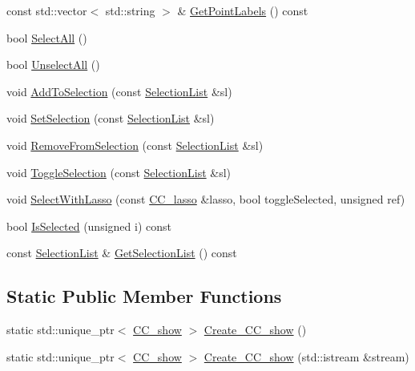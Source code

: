 \begin{DoxyCompactItemize}
\item 
const std\-::vector$<$ std\-::string $>$ \& \hyperlink{a00046_a0574f19c81b418d1eb797eaae248affd}{Get\-Point\-Labels} () const 
\item 
bool \hyperlink{a00046_aaee97d70a81c9596385f8882a626d2de}{Select\-All} ()
\item 
bool \hyperlink{a00046_aa8fe7ec10f04ef7bf151b6e64eee6e4c}{Unselect\-All} ()
\item 
void \hyperlink{a00046_a11a015a0e3eaa2532d60ae2c120fd97a}{Add\-To\-Selection} (const \hyperlink{a00214_aaec86d4bb87e1e6f0b60e6e551c5e570}{Selection\-List} \&sl)
\item 
void \hyperlink{a00046_a7c3f383669e4ac25019fbffa779238f1}{Set\-Selection} (const \hyperlink{a00214_aaec86d4bb87e1e6f0b60e6e551c5e570}{Selection\-List} \&sl)
\item 
void \hyperlink{a00046_a6c80041882f1acce3e9cef1919c65f77}{Remove\-From\-Selection} (const \hyperlink{a00214_aaec86d4bb87e1e6f0b60e6e551c5e570}{Selection\-List} \&sl)
\item 
void \hyperlink{a00046_af3690e0e71df95ed35eaab5f28525167}{Toggle\-Selection} (const \hyperlink{a00214_aaec86d4bb87e1e6f0b60e6e551c5e570}{Selection\-List} \&sl)
\item 
void \hyperlink{a00046_a0af4ec5740bda38adcca1846ee23a280}{Select\-With\-Lasso} (const \hyperlink{a00033}{C\-C\-\_\-lasso} \&lasso, bool toggle\-Selected, unsigned ref)
\item 
bool \hyperlink{a00046_af45d6cad44e602a85f6fa19b0b7cf85a}{Is\-Selected} (unsigned i) const 
\item 
const \hyperlink{a00214_aaec86d4bb87e1e6f0b60e6e551c5e570}{Selection\-List} \& \hyperlink{a00046_a2c20d9756270755eaa0710574d0f791c}{Get\-Selection\-List} () const 
\end{DoxyCompactItemize}
\subsection*{Static Public Member Functions}
\begin{DoxyCompactItemize}
\item 
static std\-::unique\-\_\-ptr$<$ \hyperlink{a00046}{C\-C\-\_\-show} $>$ \hyperlink{a00046_a86ec240f2bc5ed1988d05ae41c8a4ad7}{Create\-\_\-\-C\-C\-\_\-show} ()
\item 
static std\-::unique\-\_\-ptr$<$ \hyperlink{a00046}{C\-C\-\_\-show} $>$ \hyperlink{a00046_a30680613004af96af6dd40f4ea262913}{Create\-\_\-\-C\-C\-\_\-show} (std\-::istream \&stream)
\end{DoxyCompactItemize}
